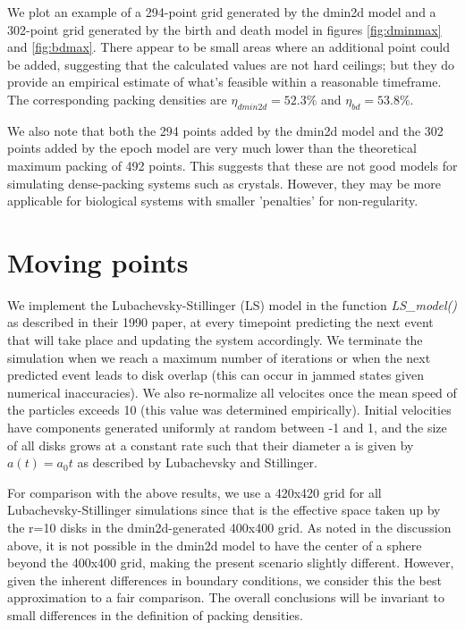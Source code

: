 \documentclass{article}
\begin{document}
We plot an example of a 294-point grid generated by the dmin2d model and a 302-point grid generated by the birth and death model in figures  \ref{fig:dminmax} and \ref{fig:bdmax}.
There appear to be small areas where an additional point could be added, suggesting that the calculated values are not hard ceilings; but they do provide an empirical estimate of what's feasible within a reasonable timeframe. The corresponding packing densities are $\eta_{dmin2d} = 52.3\%$ and $\eta_{bd} = 53.8\%$.

We also note that both the 294 points added by the dmin2d model and the 302 points added by the epoch model are very much lower than the theoretical maximum packing of 492 points. This suggests that these are not good models for simulating dense-packing systems such as crystals.
However, they may be more applicable for biological systems with smaller 'penalties' for non-regularity.




\section{Moving points}

We implement the Lubachevsky-Stillinger (LS) model in the function \textit{LS\_model()}  as described in their 1990 paper, at every timepoint predicting the next event that will take place and updating the system accordingly. We terminate the simulation when we reach a maximum number of iterations or when the next predicted event leads to disk overlap (this can occur in jammed states given numerical inaccuracies). We also re-normalize all velocites once the mean speed of the particles exceeds 10 (this value was determined empirically). Initial velocities have components generated uniformly at random between -1 and 1, and the size of all disks grows at a constant rate such that their diameter a is given by $a(t) = a_0t$ as described by Lubachevsky and Stillinger.

For comparison with the above results, we use a 420x420 grid for all Lubachevsky-Stillinger simulations since that is the effective space taken up by the r=10 disks in the dmin2d-generated 400x400 grid. As noted in the discussion above, it is not possible in the dmin2d model to have the center of a sphere beyond the 400x400 grid, making the present scenario slightly different. However, given the inherent differences in boundary conditions, we consider this the best approximation to a fair comparison. The overall conclusions will be invariant to small differences in the definition of packing densities.
\end{document}
